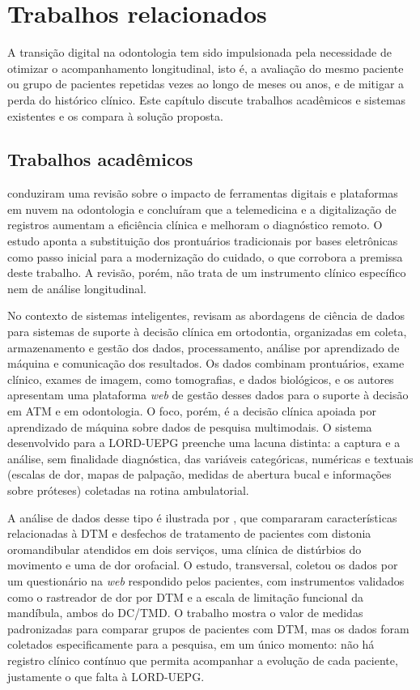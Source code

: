 \chapter{Trabalhos relacionados}
\label{cap:trabalhos}

A transição digital na odontologia tem sido impulsionada pela necessidade de otimizar o acompanhamento longitudinal, isto é, a avaliação do mesmo paciente ou grupo de pacientes repetidas vezes ao longo de meses ou anos, e de mitigar a perda do histórico clínico. Este capítulo discute trabalhos acadêmicos e sistemas existentes e os compara à solução proposta.

\section{Trabalhos acadêmicos}

 conduziram uma revisão sobre o impacto de ferramentas digitais e plataformas em nuvem na odontologia e concluíram que a telemedicina e a digitalização de registros aumentam a eficiência clínica e melhoram o diagnóstico remoto. O estudo aponta a substituição dos prontuários tradicionais por bases eletrônicas como passo inicial para a modernização do cuidado, o que corrobora a premissa deste trabalho. A revisão, porém, não trata de um instrumento clínico específico nem de análise longitudinal.

No contexto de sistemas inteligentes,  revisam as abordagens de ciência de dados para sistemas de suporte à decisão clínica em ortodontia, organizadas em coleta, armazenamento e gestão dos dados, processamento, análise por aprendizado de máquina e comunicação dos resultados. Os dados combinam prontuários, exame clínico, exames de imagem, como tomografias, e dados biológicos, e os autores apresentam uma plataforma \textit{web} de gestão desses dados para o suporte à decisão em ATM e em odontologia. O foco, porém, é a decisão clínica apoiada por aprendizado de máquina sobre dados de pesquisa multimodais. O sistema desenvolvido para a LORD-UEPG preenche uma lacuna distinta: a captura e a análise, sem finalidade diagnóstica, das variáveis categóricas, numéricas e textuais (escalas de dor, mapas de palpação, medidas de abertura bucal e informações sobre próteses) coletadas na rotina ambulatorial.

A análise de dados desse tipo é ilustrada por , que compararam características relacionadas à DTM e desfechos de tratamento de pacientes com distonia oromandibular atendidos em dois serviços, uma clínica de distúrbios do movimento e uma de dor orofacial. O estudo, transversal, coletou os dados por um questionário na \textit{web} respondido pelos pacientes, com instrumentos validados como o rastreador de dor por DTM e a escala de limitação funcional da mandíbula, ambos do DC/TMD. O trabalho mostra o valor de medidas padronizadas para comparar grupos de pacientes com DTM, mas os dados foram coletados especificamente para a pesquisa, em um único momento: não há registro clínico contínuo que permita acompanhar a evolução de cada paciente, justamente o que falta à LORD-UEPG.

